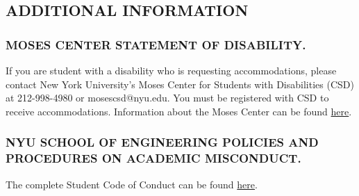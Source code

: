 \documentclass[10pt]{article}
\begin{document}
\subsection{ADDITIONAL INFORMATION}

\subsubsection{MOSES CENTER STATEMENT OF DISABILITY.}
If you are student with a disability who is requesting accommodations, please contact New York University's Moses Center for Students with Disabilities (CSD) at 212-998-4980 or mosescsd@nyu.edu.  You must be registered with CSD to receive accommodations.  Information about the Moses Center can be found \href{https://www.nyu.edu/students/communities-and-groups/students-with-disabilities.html}{here}.

\subsubsection{NYU SCHOOL OF ENGINEERING POLICIES AND PROCEDURES ON ACADEMIC MISCONDUCT.}
The complete Student Code of Conduct can be found \href{https://engineering.nyu.edu/campus-and-community/student-life/office-student-affairs/policies/student-code-conduct}{here}.
\end{document}
